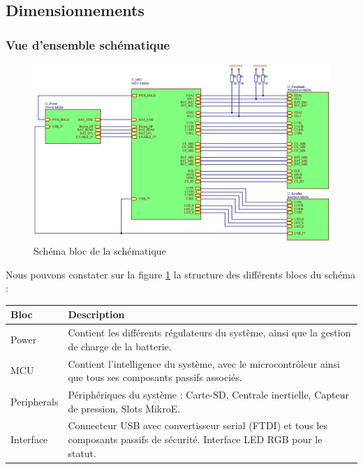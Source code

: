 \subsection{Dimensionnements} \label{ssec:num31}
{
	\subsubsection{Vue d'ensemble schématique} \label{sssec:SchemaBloc} \vspace{-6mm}
	{
		\begin{figure}[th]
			\centering
			\includegraphics[width=1.1\linewidth]{Figures/Dev-SCH/schemaBloc}
			\caption{Schéma bloc de la schématique}
			\label{fig:schemablocSCH}
		\end{figure} \vspace{-5mm}
		Nous pouvons constater sur la figure \ref{fig:schemablocSCH} la structure des différents blocs du schéma : 
		
		\begin{tabularx}{18cm}{|X|X|}
			\hline
			Bloc & Description \\
			\hline
			\hline
			Power & Contient les différents régulateurs du système, ainsi que la gestion de charge de la batterie. \\
			\hline
			MCU & Contient l'intelligence du système, avec le microcontrôleur ainsi que tous ses composants passifs associés. \\
			\hline
			Peripherals & Périphériques du système : Carte-SD, Centrale inertielle, Capteur de pression, Slots MikroE. \\ 
			\hline
			Interface & Connecteur USB avec convertisseur serial (FTDI) et tous les composants passifs de sécurité. Interface LED RGB pour le statut. \\
			\hline
		\end{tabularx}
	}


}
